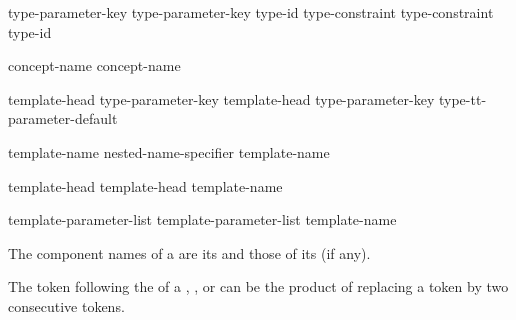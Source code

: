 \begin{bnf}
\br
  type-parameter-key  \br
  type-parameter-key  \terminal{=} type-id\br
  type-constraint  \br
  type-constraint  \terminal{=} type-id
\end{bnf}

\begin{bnf}
\br
  \br
\end{bnf}

\begin{bnf}
\br
   concept-name\br
   concept-name \terminal{<}  \terminal{>}
\end{bnf}

\begin{bnf}
\br
  template-head type-parameter-key  \br
  template-head type-parameter-key  type-tt-parameter-default
\end{bnf}

\begin{bnf}
\br
  \terminal{=}  template-name\br
  \terminal{=} nested-name-specifier  template-name
\end{bnf}

\begin{bnf}
\br
  template-head   \br
  template-head   \terminal{=}  template-name
\end{bnf}

\begin{bnf}
\br
   \terminal{<} template-parameter-list \terminal{>}   \br
   \terminal{<} template-parameter-list \terminal{>}   \terminal{=}  template-name
\end{bnf}

%
The component names of a  are
its  and
those of its  (if any).
\begin{note}
The \tcode{>} token following the
 of a
,
, or
can be the product of replacing a
\tcode{>>} token by two consecutive \tcode{>}
tokens.
\end{note}

